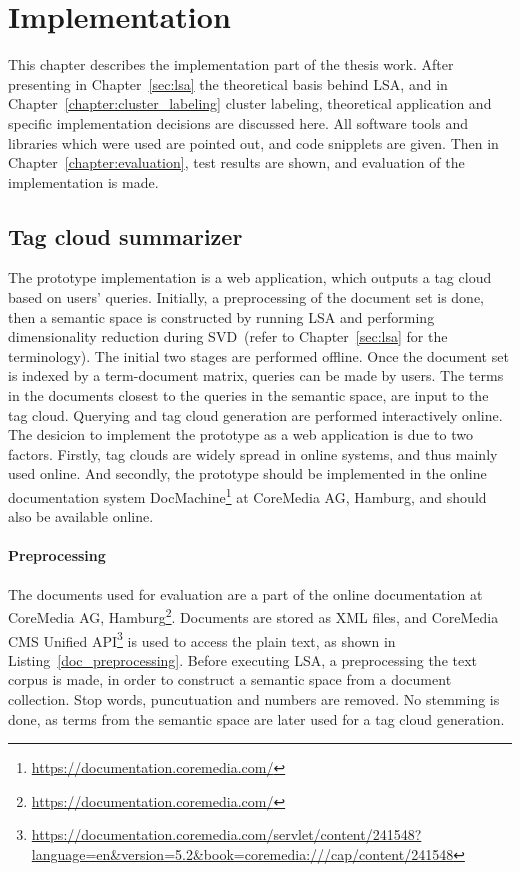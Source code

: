 \chapter{Implementation}
\label{sec:implementation}

This chapter describes the implementation part of the thesis work. After presenting in Chapter~\ref{sec:lsa} the theoretical basis behind \gls{LSA}, and in Chapter~\ref{chapter:cluster_labeling} cluster labeling, theoretical application and specific implementation decisions are discussed here. All software tools and libraries which were used are pointed out, and code snipplets are given. Then in Chapter~\ref{chapter:evaluation}, test results are shown, and evaluation of the implementation is made. \\


\section{Tag cloud summarizer}

The prototype implementation is a web application, which outputs a tag cloud based on users' queries. Initially, a preprocessing of the document set is done, then a semantic space is constructed by running \gls{LSA} and performing dimensionality reduction during \gls{SVD}~(refer to Chapter~\ref{sec:lsa} for the terminology). The initial two stages are performed offline. Once the document set is indexed by a term-document  matrix, queries can be made by users. The terms in the documents closest to the queries in the semantic space, are input to the tag cloud. Querying and tag cloud generation are performed interactively online. \\

The desicion to implement the prototype as a web application is due to two factors. Firstly, tag clouds are widely spread in online systems, and thus mainly used online. And secondly, the prototype should be implemented in the online documentation system DocMachine\footnote{\url{https://documentation.coremedia.com/}} at CoreMedia AG, Hamburg, and should also be available online. \\

\subsubsection{Preprocessing}
The documents used for evaluation are a part of the online documentation at CoreMedia AG, Hamburg\footnote{\url{https://documentation.coremedia.com/}}. Documents are stored as XML files, and CoreMedia \gls{CMS} Unified API\footnote{\url{https://documentation.coremedia.com/servlet/content/241548?language=en&version=5.2&book=coremedia:///cap/content/241548}} is used to access the plain text, as shown in Listing~\ref{doc_preprocessing}. Before executing \gls{LSA}, a preprocessing the text corpus is made, in order to construct a semantic space from a document collection. Stop words, puncutuation and numbers are removed. No stemming is done, as terms from the semantic space are later used for a tag cloud generation. 

